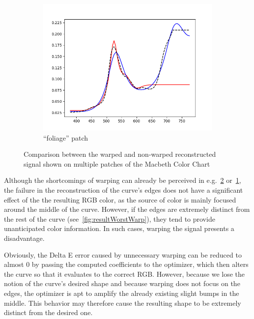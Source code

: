 \begin{figure}[t]
\begin{subfigure}[t]{0.45\textwidth}
		\label{fig:resultsTechnique_blueFlower}
	\end{subfigure} \hspace{0.1em}
	\begin{subfigure}[t]{0.45\textwidth}
		\includegraphics[width=\linewidth]{img/results_techniqueFoliage.png}
		\caption{``foliage'' patch}
		\label{fig:resultsTechnique_foliage}
	\end{subfigure}
	\caption{Comparison between the warped and non-warped reconstructed signal shown on multiple patches of the Macbeth Color Chart}
	\label{fig:resultsTechniques}
\end{figure}


Although the shortcomings of warping can already be perceived in e.g.~\cref{fig:resultsTechnique_foliage} or~\cref{fig:resultsTechnique_blueFlower}, the failure in the reconstruction of the curve's edges does not have a significant effect of the the resulting RGB color, as the source of color is mainly focused around the middle of the curve. However, if the edges are extremely distinct from the rest of the curve (see~\cref{fig:resultWorstWarp}), they tend to provide unanticipated color information. In such cases, warping the signal presents a disadvantage.

Obviously, the Delta E error caused by unnecessary warping can be reduced to almost 0 by passing the computed coefficients to the optimizer, which then alters the curve so that it evaluates to the correct RGB. However, because we lose the notion of the curve's desired shape and because warping does not focus on the edges, the optimizer is apt to amplify the already existing slight bumps in the middle. This behavior may therefore cause the resulting shape to be extremely distinct from the desired one. 

